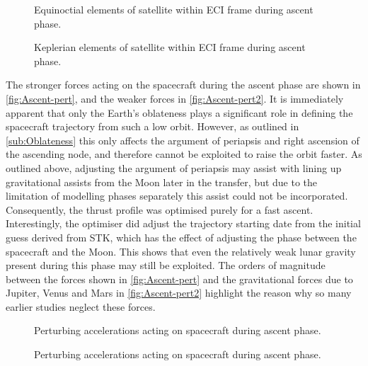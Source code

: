 \begin{figure}
\caption{Equinoctial elements of satellite within ECI frame during ascent phase.}
\label{fig:Ascent-mee}
\centering
\def\svgwidth{\figurewidth}

\end{figure}

\begin{figure}
\caption{Keplerian elements of satellite within ECI frame during ascent phase.}
\label{fig:Ascent-kep}
\centering
\def\svgwidth{\figurewidth}

\end{figure}

The stronger forces acting on the spacecraft during the ascent phase are shown in \autoref{fig:Ascent-pert}, and the weaker forces in \autoref{fig:Ascent-pert2}. It is immediately apparent that only the Earth's oblateness plays a significant role in defining the spacecraft trajectory from such a low orbit. However, as outlined in \autoref{sub:Oblateness} this only affects the argument of periapsis and right ascension of the ascending node, and therefore cannot be exploited to raise the orbit faster. As outlined above, adjusting the argument of periapsis may assist with lining up gravitational assists from the Moon later in the transfer, but due to the limitation of modelling phases separately this assist could not be incorporated. Consequently, the thrust profile was optimised purely for a fast ascent. Interestingly, the optimiser did adjust the trajectory starting date from the initial guess derived from STK, which has the effect of adjusting the phase between the spacecraft and the Moon. This shows that even the relatively weak lunar gravity present during this phase may still be exploited. The orders of magnitude between the forces shown in \autoref{fig:Ascent-pert} and the gravitational forces due to Jupiter, Venus and Mars in \autoref{fig:Ascent-pert2} highlight the reason why so many earlier studies neglect these forces. 

\begin{figure}
\caption{Perturbing accelerations acting on spacecraft during ascent phase.}
\label{fig:Ascent-pert}
\centering
\def\svgwidth{\figurewidth}

\end{figure}

\begin{figure}
\caption{Perturbing accelerations acting on spacecraft during ascent phase.}
\label{fig:Ascent-pert2}
\centering
\def\svgwidth{\figurewidth}

\end{figure}

